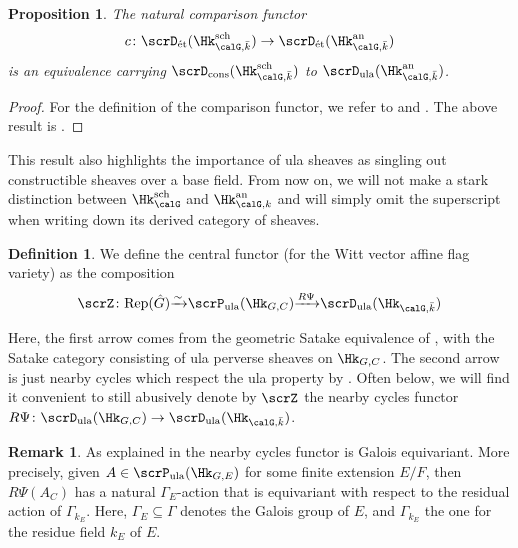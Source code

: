 \documentclass[10pt, reqno]{amsart}
\theoremstyle{plain}
\newtheorem{proposition}[theorem]{Proposition}
\theoremstyle{definition}
\newtheorem{definition}[theorem]{Definition}
\newtheorem{remark}[theorem]{Remark}
\numberwithin{equation}{section}
\begin{document}
	\begin{proposition} \label{092840dijf}
		The natural comparison functor
		\begin{equation}
			c \colon \scrD_{\mathrm{\acute{e}t}}(\Hk_{\calG,\bar k}^{\mathrm{sch}} ) \to \scrD_{\mathrm{\acute{e}t}}(\Hk_{\calG, \bar k}^{\mathrm{an}})
		\end{equation}
		is an equivalence carrying $\scrD_{\mathrm{cons}}(\Hk_{\calG,\bar k}^{\mathrm{sch}} ) $ to $\scrD_{\mathrm{ula}}(\Hk_{\calG, \bar k}^{\mathrm{an}})$.
	\end{proposition}
	\begin{proof}
		For the definition of the comparison functor, we refer to \cite[Section 27]{Sch17} and \cite[Appendix A]{AGLR22}. The above result is \cite[Propositions 6.7 and A.5]{AGLR22}.  
	\end{proof}
	
	This result also highlights the importance of ula sheaves as singling out constructible sheaves over a base field.
	From now on, we will not make a stark distinction between $\Hk_{\calG}^{\mathrm{sch}}$ and $\Hk_{\calG,k}^{\mathrm{an}}$ and will simply omit the superscript when writing down its derived category of sheaves. 
	
	\begin{definition}
		\label{sec:background-definition-central-functor}
		We define the central functor (for the Witt vector affine flag variety) as the composition
		\begin{equation}
			\scrZ\colon \mathrm{Rep}(\hat{G}) {\xrightarrow{\sim}} \scrP_{\mathrm{ula}}(\Hk_{G,C}) {\xrightarrow{R\Psi}} \scrD_{\mathrm{ula}}(\Hk_{\calG, \bar k}) 
		\end{equation}
	\end{definition}
	\noindent Here, the first arrow comes from the geometric Satake equivalence of \cite[Chapter VI]{FS21}, with the Satake category consisting of ula perverse sheaves on $\Hk_{G,C}$. The second arrow is just nearby cycles which respect the ula property by . %
	Often below, we will find it convenient to still abusively denote by $\scrZ$ the nearby cycles functor $R\Psi \colon \scrD_{\mathrm{ula}}(\Hk_{G,C})\to \scrD_{\mathrm{ula}}(\Hk_{\calG,\bar k})$. 
	
	\begin{remark}
		\label{sec:background-central-functor-with-galois-action} As explained in \cite[Section 8]{AGLR22} the nearby cycles functor is Galois equivariant. More precisely, given $A\in \scrP_{\mathrm{ula}}(\Hk_{G,E})$ for some finite extension $E/F$, then $R\Psi(A_C)$ has a natural $\Gamma_E$-action that is equivariant with respect to the residual action of $\Gamma_{k_E}$. Here, $\Gamma_E\subseteq \Gamma$ denotes the Galois group of $E$, and $\Gamma_{k_E}$ the one for the residue field $k_E$ of $E$.
	\end{remark}
	
\end{document}
